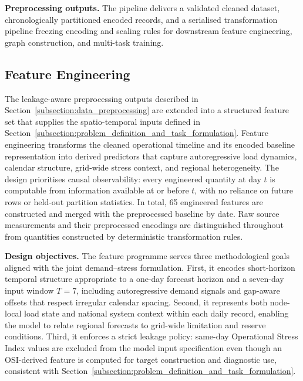 \textbf{Preprocessing outputs.} The pipeline delivers a validated cleaned dataset, chronologically partitioned encoded records, and a serialised transformation pipeline freezing encoding and scaling rules for downstream feature engineering, graph construction, and multi-task training.

\subsection{Feature Engineering}\label{subsection:feature_engineering}

The leakage-aware preprocessing outputs described in Section~\ref{subsection:data_preprocessing} are extended into a structured feature set that supplies the spatio-temporal inputs defined in Section~\ref{subsection:problem_definition_and_task_formulation}. Feature engineering transforms the cleaned operational timeline and its encoded baseline representation into derived predictors that capture autoregressive load dynamics, calendar structure, grid-wide stress context, and regional heterogeneity. The design prioritises causal observability: every engineered quantity at day \(t\) is computable from information available at or before \(t\), with no reliance on future rows or held-out partition statistics. In total, 65 engineered features are constructed and merged with the preprocessed baseline by date. Raw source measurements and their preprocessed encodings are distinguished throughout from quantities constructed by deterministic transformation rules.

\textbf{Design objectives.} The feature programme serves three methodological goals aligned with the joint demand--stress formulation. First, it encodes short-horizon temporal structure appropriate to a one-day forecast horizon and a seven-day input window \(T = 7\), including autoregressive demand signals and gap-aware offsets that respect irregular calendar spacing. Second, it represents both node-local load state and national system context within each daily record, enabling the model to relate regional forecasts to grid-wide limitation and reserve conditions. Third, it enforces a strict leakage policy: same-day Operational Stress Index values are excluded from the model input specification even though an OSI-derived feature is computed for target construction and diagnostic use, consistent with Section~\ref{subsection:problem_definition_and_task_formulation}.


